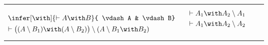 \begin{figure*}
\begin{tabular}{ccc}


\begin{equation*}
  \begin{lgathered}
    \infer[\with]{\vdash A \with B}{
      \vdash A & \vdash B}
    \\
    \vdash \bigl((A \limp B_1) \with (A \limp B_2)\bigr) \limp (A \limp B_1 \with B_2)
  \end{lgathered}
  \qquad
  \begin{lgathered}[b]
    \vdash A_1 \with A_2 \limp A_1 \\
    \vdash A_1 \with A_2 \limp A_2
  \end{lgathered}
\end{equation*}






\end{tabular}
\end{figure*}
